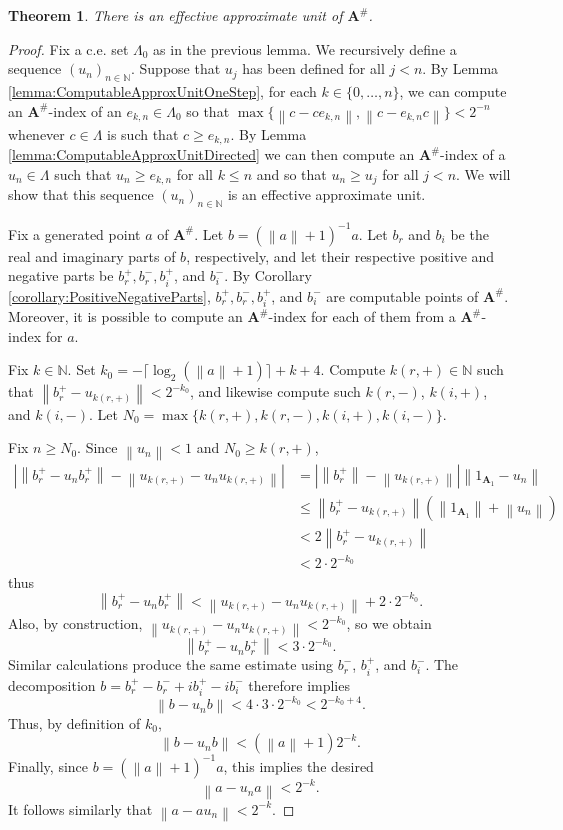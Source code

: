 \documentclass{amsart}
\newcommand{\norm}[1]{\left\| #1 \right\|}
\newcommand{\abs}[1]{\left\vert #1 \right\vert}
\newcommand{\boldA}{\mathbf{A}}
\theoremstyle{plain}
\newtheorem{theorem}{Theorem}[section]
\theoremstyle{definition}
\numberwithin{equation}{section}
\begin{document}
\begin{theorem}\label{thm:ApproximateUnit}
There is an effective approximate unit of $\boldA^\#$.
\end{theorem}
\begin{proof}
Fix a c.e. set $\Lambda_0$ as in the previous lemma.  We recursively define a sequence $(u_n)_{n\in\mathbb{N}}$.  Suppose that $u_j$ has been defined for all $j < n$.  By Lemma \ref{lemma:ComputableApproxUnitOneStep}, for each $k \in \{0, \ldots, n\}$, we can compute an $\boldA^\#$-index of an $e_{k,n} \in \Lambda_0$ so that $\max\{\norm{c-ce_{k,n}}, \norm{c-e_{k,n}c}\} < 2^{-n}$ whenever $c \in \Lambda$ is such that $c \geq e_{k,n}$.  By Lemma \ref{lemma:ComputableApproxUnitDirected} we can then compute an $\boldA^\#$-index of a $u_n \in \Lambda$ such that $u_n \geq e_{k, n}$ for all $k \leq n$ and so that $u_n \geq u_j$ for all $j < n$.  We will show that this sequence $(u_n)_{n\in\mathbb{N}}$ is an effective approximate unit.

Fix a generated point $a$ of $\boldA^\#$.  Let $b = (\norm{a}+1)^{-1}a$.  Let $b_r$ and $b_i$ be the real and imaginary parts of $b$, respectively, and let their respective positive and negative parts be $b_r^+, b_r^-, b_i^+$, and $b_i^-$.  By Corollary \ref{corollary:PositiveNegativeParts}, $b_r^+, b_r^-, b_i^+$, and $b_i^-$ are computable points of $\boldA^\#$.  Moreover, it is possible to compute an $\boldA^\#$-index for each of them from a $\boldA^\#$-index for $a$.

Fix $k \in \mathbb{N}$.  Set $k_0 = -\lceil \log_2(\norm{a} + 1) \rceil + k + 4$.  Compute $k(r, +) \in \mathbb{N}$ such that $\norm{b_r^+-u_{k(r,+)}} < 2^{-k_0}$, and likewise compute such $k(r, -)$, $k(i, +)$, and $k(i, -)$.  Let $N_0 = \max\{k(r,+), k(r,-), k(i,+), k(i, -)\}$.

Fix $n \geq N_0$.  Since $\norm{u_n} < 1$ and $N_0 \geq k(r,+)$,
\begin{align*}
\abs{\norm{b_r^+ - u_n b_r^+} - \norm{u_{k(r,+)} - u_n u_{k(r,+)}}}
&= \abs{\norm{b_r^+} - \norm{u_{k(r,+)}}}\norm{1_{\boldA_1}-u_n} \\ &\leq \norm{b_r^+-u_{k(r,+)}}(\norm{1_{\boldA_1}}+\norm{u_n}) \\
&< 2\norm{b_r^+ - u_{k(r,+)} } \\
&< 2\cdot2^{-k_0}
\end{align*}
thus
\[\norm{b_r^+ - u_nb_r^+} < \norm{u_{k(r,+)} - u_nu_{k(r,+)}} + 2\cdot2^{-k_0}.\]
Also, by construction, $\norm{u_{k(r,+)}-u_nu_{k(r,+)}} < 2^{-k_0}$, so we obtain
\[\norm{b_r^+ - u_nb_r^+} < 3\cdot2^{-k_0}.\]
Similar calculations produce the same estimate using $b_r^-$, $b_i^+$, and $b_i^-$. The decomposition $b = b_r^+ - b_r^- + ib_i^+ - ib_i^-$
therefore implies
\[
\norm{b-u_nb} < 4\cdot3\cdot2^{-k_0} < 2^{-k_0+4}.
\]
Thus, by definition of $k_0$,
\[\norm{b-u_nb} < (\norm{a}+1)2^{-k}.\]
Finally, since $b = (\norm{a}+1)^{-1}a$, this implies the desired
\[\norm{a-u_na} < 2^{-k}.\]
It follows similarly that $\norm{a - a u_n} < 2^{-k}$.
\end{proof}
\end{document}
